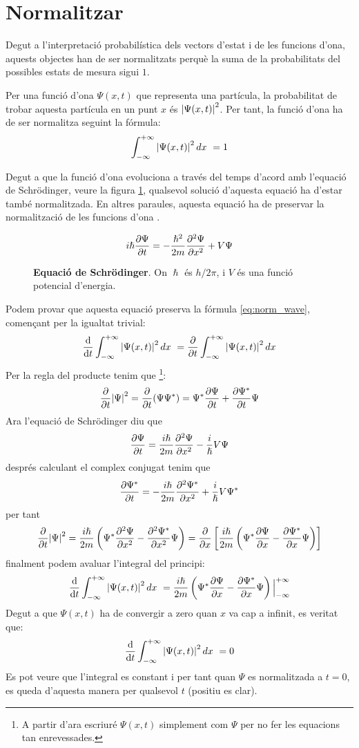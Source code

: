\section{Normalitzar}
Degut a l'interpretació probabilística dels vectors d'estat i de les funcions d'ona, aquests objectes han de ser normalitzats perquè la suma de la probabilitats del possibles estats de mesura sigui $1$. 

Per una funció d'ona $\Psi(x,t)$ que representa una partícula, la probabilitat de trobar aquesta partícula en un punt $x$ és $\abs{\Psi(x,t)}^2$. Per tant, la funció d'ona ha de ser normalitza seguint la fórmula: 
\begin{equation}
\int_{-\infty}^{+\infty}\abs{\Psi(x,t)}^2\, dx\ = 1
\label{eq:norm_wave}
\end{equation}

Degut a que la funció d'ona evoluciona a través del temps d'acord amb l'equació de Schrödinger, veure la figura \ref{fig:schro}, qualsevol solució d'aquesta equació ha d'estar també normalitzada. En altres paraules, aquesta equació ha de preservar la normalització de les funcions d'ona \cite{IntroQM:normalizing}.
\begin{figure}[H]
	$$
	i\hslash \pdv{\Psi}{t} = -\frac{\hslash^2}{2m}\pdv[2]{\Psi}{x}+V\Psi
	$$
	\caption{\textbf{Equació de Schrödinger}. On $\hslash$ és $h/2\pi$, i $V$ és una funció potencial d'energia.}
	\label{fig:schro}
\end{figure}

Podem provar que aquesta equació preserva la fórmula \ref{eq:norm_wave}, començant per la igualtat trivial:
$$
\dv{t} \int_{-\infty}^{+\infty}\abs{\Psi(x,t)}^2\, dx\ = \pdv{t} \int_{-\infty}^{+\infty}\abs{\Psi(x,t)}^2\, dx
$$
Per la regla del producte tenim que \footnote{A partir d'ara escriuré  $\Psi(x,t)$ simplement com $\Psi$ per no fer les equacions tan enrevessades.}:
$$
\pdv{t}\abs{\Psi}^2 = \pdv{t}(\Psi\Psi^*) = \Psi^*\pdv{\Psi}{t} + \pdv{\Psi^*}{t}\Psi
$$
Ara l'equació de Schrödinger diu que
$$
\pdv{\Psi}{t} = \frac{i\hslash}{2m}\pdv[2]{\Psi}{x} -  \frac{i}{\hslash}V\Psi
$$
després calculant el complex conjugat tenim que 
$$
\pdv{\Psi^*}{t} = - \frac{i\hslash}{2m}\pdv[2]{\Psi^*}{x} + \frac{i}{\hslash}V\Psi^*
$$
per tant
$$
\pdv{t}\abs{\Psi}^2 = \frac{i\hslash}{2m} \left( \Psi^*\pdv[2]{\Psi}{x} - \pdv[2]{\Psi^*}{x}\Psi \right) = \pdv{x} \left[ \frac{i\hslash}{2m} \left(\Psi^*\pdv{\Psi}{x} - \pdv{\Psi^*}{x}\Psi\right)\right]
$$
finalment podem avaluar l'integral del principi:
$$
\dv{t} \int_{-\infty}^{+\infty}\abs{\Psi(x,t)}^2\, dx\ = \frac{i\hslash}{2m} \left( \Psi^*\pdv{\Psi}{x} - \pdv{\Psi^*}{x}\Psi \right) \Big|_{-\infty}^{+\infty}
$$
Degut a que $\Psi(x,t)$ ha de convergir a zero quan $x$ va cap a infinit, es veritat que:
$$
\dv{t} \int_{-\infty}^{+\infty}\abs{\Psi(x,t)}^2\, dx\ = 0
$$
Es pot veure que l'integral es constant i per tant quan $\Psi$ es normalitzada a $t=0$, es queda d'aquesta manera per qualsevol $t$ (positiu es clar). 

